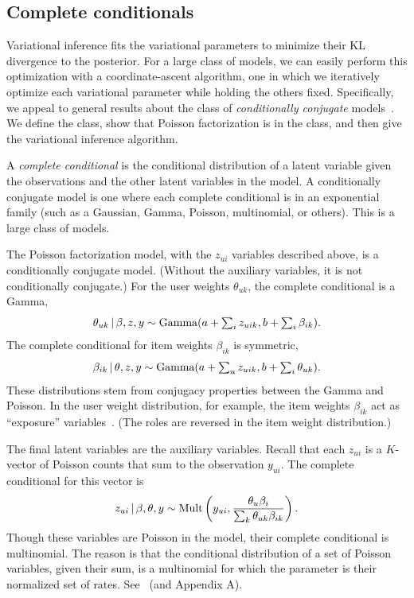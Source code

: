 \documentclass{sig-alternate}
\begin{document}
\subsection{Complete conditionals}

Variational inference fits the variational parameters to minimize
their KL divergence to the posterior.  For a large class of models, we
can easily perform this optimization with a coordinate-ascent
algorithm, one in which we iteratively optimize each variational
parameter while holding the others fixed.  Specifically, we appeal to
general results about the class of \textit{conditionally conjugate}
models~\cite{Ghahramani:2001,Hoffman:2013}.  We define the class, show
that Poisson factorization is in the class, and then give the
variational inference algorithm.

A \textit{complete conditional} is the conditional distribution of a
latent variable given the observations and the other latent variables
in the model.  A conditionally conjugate model is one where each
complete conditional is in an exponential family (such as a Gaussian,
Gamma, Poisson, multinomial, or others).  This is a large class of
models.

The Poisson factorization model, with the $z_{ui}$ variables described
above, is a conditionally conjugate model.  (Without the auxiliary
variables, it is not conditionally conjugate.) For the user weights
$\theta_{uk}$, the complete conditional is a Gamma,
\begin{equation}
  \label{eq:user-weight-cc}
  \theta_{uk} \,\vert\, \beta, z, y \sim
  \textrm{Gamma}(a + \textstyle \sum_{i} z_{uik},
  b + \sum_{i} \beta_{ik}).
\end{equation}
The complete conditional for item weights $\beta_{ik}$ is symmetric,
\begin{equation}
  \label{eq:item-weight-cc}
  \beta_{ik} \,\vert\, \theta, z, y \sim
  \textrm{Gamma}(a + \textstyle \sum_{u} z_{uik},
  b + \sum_{i} \theta_{uk}).
\end{equation}
These distributions stem from conjugacy properties between the Gamma
and Poisson. In the user weight distribution, for example, the item
weights $\beta_{ik}$ act as ``exposure'' variables~\cite{Gelman:1995}.
(The roles are reversed in the item weight distribution.)

The final latent variables are the auxiliary variables.  Recall that
each $z_{ui}$ is a $K$-vector of Poisson counts that sum to the
observation $y_{ui}$. The complete conditional for this vector is
\begin{equation}
  \label{eq:aux-cc}
  z_{ui} \,\vert\, \beta, \theta, y \sim \textrm{Mult}\left(y_{ui}, \frac{\theta_{u} 
      \beta_{i}}{\textstyle \sum_{k} \theta_{uk} \beta_{ik}}\right).
\end{equation}
Though these variables are Poisson in the model, their complete
conditional is multinomial.  The reason is that the conditional
distribution of a set of Poisson variables, given their sum, is a
multinomial for which the parameter is their normalized set of rates.
See~\cite{Johnson:2005} (and Appendix A).
\end{document}
